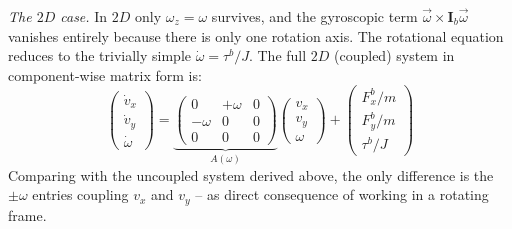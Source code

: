 \emph{The $2D$ case.}
In $2D$ only $\omega_z = \omega$ survives, and the gyroscopic term
$\vec{\omega}\times\mathbf{I}_b\vec{\omega}$ vanishes entirely because there is only one
rotation axis. The rotational equation reduces to the trivially simple $\dot{\omega} =
\tau^b / J$. The full $2D$ (coupled) system in component-wise matrix form is:
\begin{equation}
    \begin{pmatrix} \dot{v}_x \\ \dot{v}_y \\ \dot{\omega} \end{pmatrix}
    =
    \underbrace{
    \begin{pmatrix} 0 & +\omega & 0 \\ -\omega & 0 & 0 \\ 0 & 0 & 0 \end{pmatrix}
    }_{A(\omega)}
    \begin{pmatrix} v_x \\ v_y \\ \omega \end{pmatrix}
    +
    \begin{pmatrix} F_x^b/m \\ F_y^b/m \\ \tau^b/J \end{pmatrix}
    \label{eq:newton_euler_2d_body_matrix}
\end{equation}
Comparing with the uncoupled system derived above, the only difference is the $\pm\omega$
entries coupling $v_x$ and $v_y$ -- as direct consequence of working in a rotating
frame.\\

